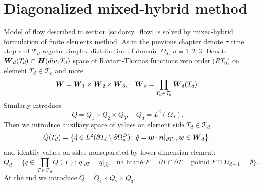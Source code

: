 \section{Diagonalized mixed-hybrid method}
\def\mr{\mathring}
Model of flow described in section \ref{sc:darcy_flow} is solved by
mixed-hybrid formulation of finite elements method.
As in the previous chapter denote
$\tau$ time step and $\mathcal T_d$ regular simplex distribution of domain
$\Omega_d$, $d=1,2,3$.
Denote $\mathbf{\boldsymbol{W}}_d(T_d)\subset \mathbf{\boldsymbol{H}}(div,T_d)$
 space of Raviart-Thomas functions zero order ($RT_0$) on element $T_d\in 
\mathcal T_d$ and more
\[
    \mathbf{\boldsymbol{W}} =  \mathbf{\boldsymbol{W}}_1 \times \mathbf{\boldsymbol{W}}_2 \times \mathbf{\boldsymbol{W}}_3,\quad
    \mathbf{\boldsymbol{W}}_d = \prod_{T_d\in \mathcal T_d} \mathbf{\boldsymbol{W}}_d(T_d).
\]
Similarly introduce
\begin{equation}
Q=Q_{1}\times Q_{2}\times Q_{3},
\quad
Q_{d}=L^{2}\left(  \Omega_{d}\right).
\end{equation}
Then we introduce auxiliary space of values on element side $T_d\in \mathcal T_d$
\begin{equation}
    \mr Q(T_d)=\left\{  \mr q\in 
    L^{2}(\partial T_d \setminus  \partial\Omega_d^D):
    \mr q =\vc w\cdot \vc n|_{\partial T_d},
    \vc w\in\vc W_d%
    \right\}.
\end{equation}
and identify values on sides nonseparated by lower dimension element:
\begin{equation}
    \mr Q_d=\Big\{
        \mr q\in\prod_{T \in \mathcal T_d} \mr Q(T);
        \ \mr q|_{\partial T}=\mr q|_{\partial \tilde T}%
        \quad\text{na hraně }F=\partial T\cap\partial \tilde T
        \quad\text{ pokud }F\cap\Omega_{d-1}=\emptyset
    \Big\}.
\end{equation}
At the end we introduce $\mr Q = \mr Q_1 \times \mr Q_2 \times \mr Q_3$.

